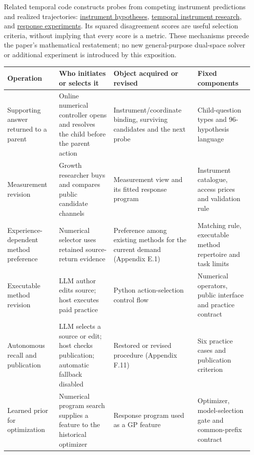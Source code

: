 \documentclass[twoside,11pt]{article}
\begin{document}
Related temporal code constructs probes from competing instrument predictions and realized trajectories: \hyperlink{artifact-50}{instrument hypotheses}, \hyperlink{artifact-51}{temporal instrument research}, and \hyperlink{artifact-52}{response experiments}. Its squared disagreement scores are useful selection criteria, without implying that every score is a metric. These mechanisms precede the paper's mathematical restatement; no new general-purpose dual-space solver or additional experiment is introduced by this exposition.


\begingroup\small\setlength{\tabcolsep}{4pt}
\renewcommand{\arraystretch}{1.18}
\par\addvspace{.7em}\noindent\begin{minipage}{\linewidth}
\begin{tabular}{@{}>{\raggedright\arraybackslash}p{}>{\raggedright\arraybackslash}p{}>{\raggedright\arraybackslash}p{}>{\raggedright\arraybackslash}p{}@{}}
\toprule
\textbf{Operation} & \textbf{Who initiates or selects it} & \textbf{Object acquired or revised} & \textbf{Fixed components} \\
\midrule
Supporting answer returned to a parent & Online numerical controller opens and resolves the child before the parent action & Instrument/\allowbreak coordinate binding, surviving candidates and the next probe & Child-question types and 96-hypothesis language \\
Measurement revision & Growth researcher buys and compares public candidate channels & Measurement view and its fitted response program & Instrument catalogue, access prices and validation rule \\
Experience-dependent method preference & Numerical selector uses retained source-return evidence & Preference among existing methods for the current demand (Appendix E.1) & Matching rule, executable method repertoire and task limits \\
Executable method revision & LLM author edits source; host executes paid practice & Python action-selection control flow & Numerical operators, public interface and practice contract \\
Autonomous recall and publication & LLM selects a source or edit; host checks publication; automatic fallback disabled & Restored or revised procedure (Appendix F.11) & Six practice cases and publication criterion \\
Learned prior for optimization & Numerical program search supplies a feature to the historical optimizer & Response program used as a GP feature & Optimizer, model-selection gate and common-prefix contract \\
\bottomrule
\end{tabular}
\end{minipage}\par\addvspace{.7em}
\end{document}
